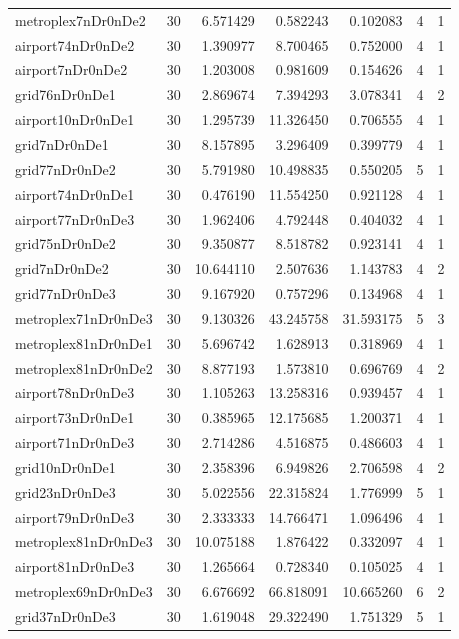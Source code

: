 \begin{longtable}{|l|r|r|r|r|r|r|}
metroplex7nDr0nDe2 & 30 & 6.571429 & 0.582243 & 0.102083 & 4 & 1 \\
airport74nDr0nDe2 & 30 & 1.390977 & 8.700465 & 0.752000 & 4 & 1 \\
airport7nDr0nDe2 & 30 & 1.203008 & 0.981609 & 0.154626 & 4 & 1 \\
grid76nDr0nDe1 & 30 & 2.869674 & 7.394293 & 3.078341 & 4 & 2 \\
airport10nDr0nDe1 & 30 & 1.295739 & 11.326450 & 0.706555 & 4 & 1 \\
grid7nDr0nDe1 & 30 & 8.157895 & 3.296409 & 0.399779 & 4 & 1 \\
grid77nDr0nDe2 & 30 & 5.791980 & 10.498835 & 0.550205 & 5 & 1 \\
airport74nDr0nDe1 & 30 & 0.476190 & 11.554250 & 0.921128 & 4 & 1 \\
airport77nDr0nDe3 & 30 & 1.962406 & 4.792448 & 0.404032 & 4 & 1 \\
grid75nDr0nDe2 & 30 & 9.350877 & 8.518782 & 0.923141 & 4 & 1 \\
grid7nDr0nDe2 & 30 & 10.644110 & 2.507636 & 1.143783 & 4 & 2 \\
grid77nDr0nDe3 & 30 & 9.167920 & 0.757296 & 0.134968 & 4 & 1 \\
metroplex71nDr0nDe3 & 30 & 9.130326 & 43.245758 & 31.593175 & 5 & 3 \\
metroplex81nDr0nDe1 & 30 & 5.696742 & 1.628913 & 0.318969 & 4 & 1 \\
metroplex81nDr0nDe2 & 30 & 8.877193 & 1.573810 & 0.696769 & 4 & 2 \\
airport78nDr0nDe3 & 30 & 1.105263 & 13.258316 & 0.939457 & 4 & 1 \\
airport73nDr0nDe1 & 30 & 0.385965 & 12.175685 & 1.200371 & 4 & 1 \\
airport71nDr0nDe3 & 30 & 2.714286 & 4.516875 & 0.486603 & 4 & 1 \\
grid10nDr0nDe1 & 30 & 2.358396 & 6.949826 & 2.706598 & 4 & 2 \\
grid23nDr0nDe3 & 30 & 5.022556 & 22.315824 & 1.776999 & 5 & 1 \\
airport79nDr0nDe3 & 30 & 2.333333 & 14.766471 & 1.096496 & 4 & 1 \\
metroplex81nDr0nDe3 & 30 & 10.075188 & 1.876422 & 0.332097 & 4 & 1 \\
airport81nDr0nDe3 & 30 & 1.265664 & 0.728340 & 0.105025 & 4 & 1 \\
metroplex69nDr0nDe3 & 30 & 6.676692 & 66.818091 & 10.665260 & 6 & 2 \\
grid37nDr0nDe3 & 30 & 1.619048 & 29.322490 & 1.751329 & 5 & 1 \\

\end{longtable}

